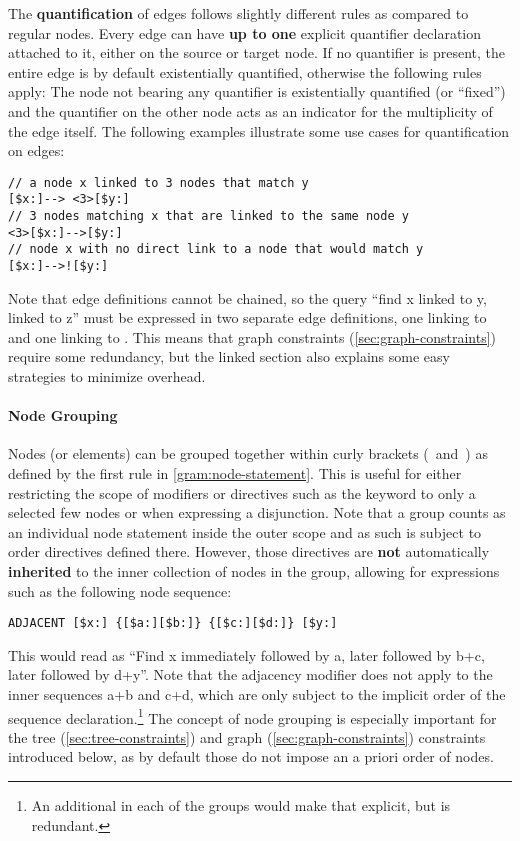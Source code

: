 \documentclass[11pt,a4paper]{article}
\begin{document}
The \textbf{quantification} of edges follows slightly different rules as compared to regular nodes.
Every edge can have \textbf{up to one} explicit quantifier declaration attached to it, either on the source or target node.
If no quantifier is present, the entire edge is by default existentially quantified, otherwise the following rules apply:
The node not bearing any quantifier is existentially quantified (or ``fixed'') and the quantifier on the other node acts as an indicator for the multiplicity of the edge itself.
The following examples illustrate some use cases for quantification on edges:

\begin{Verbatim}[samepage=true]
// a node x linked to 3 nodes that match y
[$x:]--> <3>[$y:]
// 3 nodes matching x that are linked to the same node y   
<3>[$x:]-->[$y:]
// node x with no direct link to a node that would match y
[$x:]-->![$y:]
\end{Verbatim}

\noindent Note that edge definitions cannot be chained, so the query ``find x linked to y, linked to z'' must be expressed in two separate edge definitions, one linking  to  and one linking  to .
This means that graph constraints (\ref{sec:graph-constraints}) require some redundancy, but the linked section also explains some easy strategies to minimize overhead.

\paragraph{Node Grouping}
\noindent Nodes (or elements) can be grouped together within curly brackets (\lit{\{}~and~\lit{\}}) as defined by the first  rule in \cref{gram:node-statement}.
This is useful for either restricting the scope of modifiers or directives such as the  keyword to only a selected few nodes or when expressing a disjunction.
Note that a group counts as an individual node statement inside the outer scope and as such is subject to order directives defined there.
However, those directives are \textbf{not} automatically \textbf{inherited} to the inner collection of nodes in the group, allowing for expressions such as the following node sequence:
\begin{Verbatim}[samepage=true]
ADJACENT [$x:] {[$a:][$b:]} {[$c:][$d:]} [$y:]
\end{Verbatim}
\noindent This would read as ``Find x immediately followed by a, later followed by b+c, later followed by d+y''.
Note that the adjacency modifier does not apply to the inner sequences a+b and c+d, which are only subject to the implicit order of the sequence declaration.\footnote{An additional  in each of the groups would make that explicit, but is redundant.}
The concept of node grouping is especially important for the tree (\ref{sec:tree-constraints}) and graph (\ref{sec:graph-constraints}) constraints introduced below, as by default those do not impose an a priori order of nodes.
\end{document}
